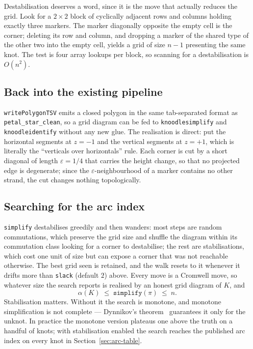 \documentclass[11pt,oneside]{report}
\theoremstyle{definition}
\begin{document}
Destabilisation deserves a word, since it is the move that actually reduces
the grid. Look for a $2 \times 2$ block of cyclically adjacent rows and
columns holding exactly three markers. The marker diagonally opposite the
empty cell is the corner; deleting its row and column, and dropping a marker
of the shared type of the other two into the empty cell, yields a grid of
size $n - 1$ presenting the same knot. The test is four array lookups per
block, so scanning for a destabilisation is $O(n^2)$.

\subsection{Back into the existing pipeline}

\texttt{writePolygonTSV} emits a closed polygon in the same tab-separated
format as \texttt{petal\_star\_clean}, so a grid diagram can be fed to
\texttt{knoodlesimplify} and \texttt{knoodleidentify} without any new glue.
The realisation is direct: put the horizontal segments at $z = -1$ and the
vertical segments at $z = +1$, which is literally the ``verticals over
horizontals'' rule. Each corner is cut by a short diagonal of length
$\varepsilon = 1/4$ that carries the height change, so that no projected
edge is degenerate; since the $\varepsilon$-neighbourhood of a marker
contains no other strand, the cut changes nothing topologically.

\subsection{Searching for the arc index}\label{sec:arc-search}

\texttt{simplify} destabilises greedily and then wanders: most steps are
random commutations, which preserve the grid size and shuffle the diagram
within its commutation class looking for a corner to destabilise; the rest
are stabilisations, which cost one unit of size but can expose a corner
that was not reachable otherwise. The best grid seen is retained, and the
walk resets to it whenever it drifts more than \texttt{slack} (default
$2$) above. Every move is a Cromwell move, so whatever size the search
reports is realised by an honest grid diagram of $K$, and
\[
\alpha(K) \;\leq\; \texttt{simplify}(\pi) \;\leq\; n.
\]
Stabilisation matters. Without it the search is monotone, and monotone
simplification is not complete --- Dynnikov's theorem~\cite{Dynnikov}
guarantees it only for the unknot. In practice the monotone version
plateaus one above the truth on a handful of knots; with stabilisation
enabled the search reaches the published arc index on every knot in
Section~\ref{sec:arc-table}.
\end{document}
